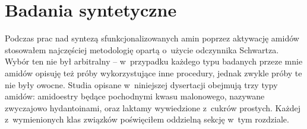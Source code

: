 \chapter{Badania syntetyczne}\label{chapter:synthesis}

Podczas prac nad syntezą sfunkcjonalizowanych amin poprzez aktywację amidów
  stosowałem najczęściej metodologię opartą o~użycie odczynnika Schwartza.
Wybór ten nie był arbitralny \--- w~przypadku każdego typu badanych przeze mnie
  amidów opisuję też próby wykorzystujące inne procedury,
  jednak zwykle próby te nie były owocne.
Studia opisane w~niniejszej dysertacji obejmują trzy typy amidów:
  amidoestry będące pochodnymi kwasu malonowego,
   nazywane zwyczajowo hydantoinami,
  oraz laktamy wywiedzione z~cukrów prostych.
Każdej z~wymienionych klas związków poświęciłem oddzielną sekcję w~tym rozdziale.


